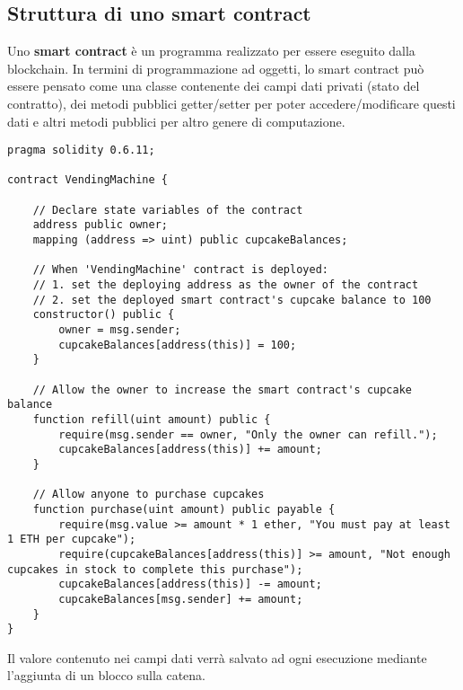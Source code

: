     \subsection{Struttura di uno smart contract}
    Uno \textbf{smart contract} è un programma realizzato per essere eseguito dalla blockchain. In termini di programmazione ad oggetti, lo smart contract può essere pensato come una classe contenente dei campi dati privati (stato del contratto), dei metodi pubblici getter/setter per poter accedere/modificare questi dati e altri metodi pubblici per altro genere di computazione.

    \begin{lstlisting}[language=Solidity]
pragma solidity 0.6.11;

contract VendingMachine {

    // Declare state variables of the contract
    address public owner;
    mapping (address => uint) public cupcakeBalances;

    // When 'VendingMachine' contract is deployed:
    // 1. set the deploying address as the owner of the contract
    // 2. set the deployed smart contract's cupcake balance to 100
    constructor() public {
        owner = msg.sender;
        cupcakeBalances[address(this)] = 100;
    }

    // Allow the owner to increase the smart contract's cupcake balance
    function refill(uint amount) public {
        require(msg.sender == owner, "Only the owner can refill.");
        cupcakeBalances[address(this)] += amount;
    }

    // Allow anyone to purchase cupcakes
    function purchase(uint amount) public payable {
        require(msg.value >= amount * 1 ether, "You must pay at least 1 ETH per cupcake");
        require(cupcakeBalances[address(this)] >= amount, "Not enough cupcakes in stock to complete this purchase");
        cupcakeBalances[address(this)] -= amount;
        cupcakeBalances[msg.sender] += amount;
    }
}
    \end{lstlisting}

    Il valore contenuto nei campi dati verrà salvato ad ogni esecuzione mediante l'aggiunta di un blocco sulla catena.

